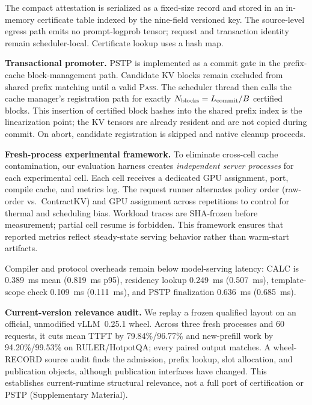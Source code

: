 \documentclass[journal]{IEEEtran}
\begin{document}
The compact attestation is serialized as a fixed-size record and stored in an in-memory certificate table indexed by the nine-field versioned key. The source-level egress path emits no prompt-logprob tensor; request and transaction identity remain scheduler-local. Certificate lookup uses a hash map.

\smallskip
\noindent\textbf{Transactional promoter.}
PSTP is implemented as a commit gate in the prefix-cache block-management path. Candidate KV blocks remain excluded from shared prefix matching until a valid \textsc{Pass}. The scheduler thread then calls the cache manager's registration path for exactly $N_{\rm blocks}=L_{\rm commit}/B$ certified blocks. This insertion of certified block hashes into the shared prefix index is the linearization point; the KV tensors are already resident and are not copied during commit. On abort, candidate registration is skipped and native cleanup proceeds.

\smallskip
\noindent\textbf{Fresh-process experimental framework.}
To eliminate cross-cell cache contamination, our evaluation harness creates \emph{independent server processes} for each experimental cell. Each cell receives a dedicated GPU assignment, port, compile cache, and metrics log. The request runner alternates policy order (raw-order vs.\ ContractKV) and GPU assignment across repetitions to control for thermal and scheduling bias. Workload traces are SHA-frozen before measurement; partial cell resume is forbidden. This framework ensures that reported metrics reflect steady-state serving behavior rather than warm-start artifacts.

Compiler and protocol overheads remain below model-serving latency: CALC is 0.389~ms mean (0.819~ms p95), residency lookup 0.249~ms (0.507~ms), template-scope check 0.109~ms (0.111~ms), and PSTP finalization 0.636~ms (0.685~ms).

\smallskip
\noindent\textbf{Current-version relevance audit.}
We replay a frozen qualified layout on an official, unmodified vLLM~0.25.1 wheel. Across three fresh processes and 60 requests, it cuts mean TTFT by 79.84\%/96.77\% and new-prefill work by 94.20\%/99.53\% on RULER/HotpotQA; every paired output matches. A wheel-RECORD source audit finds the admission, prefix lookup, slot allocation, and publication objects, although publication interfaces have changed. This establishes current-runtime structural relevance, not a full port of certification or PSTP (Supplementary Material).
\end{document}
